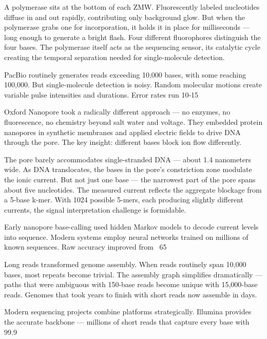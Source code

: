 A polymerase sits at the bottom of each ZMW. Fluorescently labeled nucleotides diffuse in and out rapidly, contributing only background glow. But when the polymerase grabs one for incorporation, it holds it in place for milliseconds — long enough to generate a bright flash. Four different fluorophores distinguish the four bases. The polymerase itself acts as the sequencing sensor, its catalytic cycle creating the temporal separation needed for single-molecule detection.

PacBio routinely generates reads exceeding 10,000 bases, with some reaching 100,000. But single-molecule detection is noisy. Random molecular motions create variable pulse intensities and durations. Error rates run 10-15%

Oxford Nanopore took a radically different approach — no enzymes, no fluorescence, no chemistry beyond salt water and voltage. They embedded protein nanopores in synthetic membranes and applied electric fields to drive DNA through the pore. The key insight: different bases block ion flow differently.

The pore barely accommodates single-stranded DNA — about 1.4 nanometers wide. As DNA translocates, the bases in the pore's constriction zone modulate the ionic current. But not just one base — the narrowest part of the pore spans about five nucleotides. The measured current reflects the aggregate blockage from a 5-base k-mer. With 1024 possible 5-mers, each producing slightly different currents, the signal interpretation challenge is formidable.

Early nanopore base-calling used hidden Markov models to decode current levels into sequence. Modern systems employ neural networks trained on millions of known sequences. Raw accuracy improved from ~65%

Long reads transformed genome assembly. When reads routinely span 10,000 bases, most repeats become trivial. The assembly graph simplifies dramatically — paths that were ambiguous with 150-base reads become unique with 15,000-base reads. Genomes that took years to finish with short reads now assemble in days.

Modern sequencing projects combine platforms strategically. Illumina provides the accurate backbone — millions of short reads that capture every base with 99.9%

